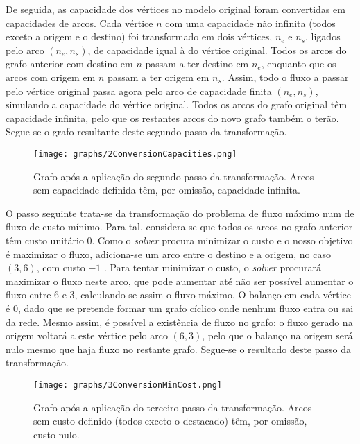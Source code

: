 \documentclass[12pt, a4paper, titlepage]{article}
\begin{document}
De seguida, as capacidade dos vértices no modelo original foram convertidas em capacidades de arcos.
Cada vértice $n$ com uma capacidade não infinita (todos exceto a origem e o destino) foi
transformado em dois vértices, $n_e$ e $n_s$, ligados pelo arco $(n_e, n_s)$, de capacidade igual à
do vértice original. Todos os arcos do grafo anterior com destino em $n$ passam a ter destino em
$n_e$, enquanto que os arcos com origem em $n$ passam a ter origem em $n_s$. Assim, todo o fluxo a
passar pelo vértice original passa agora pelo arco de capacidade finita $(n_e, n_s)$, simulando a
capacidade do vértice original. Todos os arcos do grafo original têm capacidade infinita, pelo que
os restantes arcos do novo grafo também o terão. Segue-se o grafo resultante deste segundo passo da
transformação.

\begin{figure}[H]
    \centering
    \texttt{[image: graphs/2ConversionCapacities.png]}
    \caption{Grafo após a aplicação do segundo passo da transformação. Arcos sem capacidade
        definida têm, por omissão, capacidade infinita.}
    \label{2conversion-graph}
\end{figure}

O passo seguinte trata-se da transformação do problema de fluxo máximo num de fluxo de custo mínimo.
Para tal, considera-se que todos os arcos no grafo anterior têm custo unitário 0. Como o
\emph{solver} procura minimizar o custo e o nosso objetivo é maximizar o fluxo, adiciona-se um arco
entre o destino e a origem, no caso $(3, 6)$, com custo $-1$ \cite{book}. Para tentar minimizar o
custo, o \emph{solver} procurará maximizar o fluxo neste arco, que pode aumentar até não ser
possível aumentar o fluxo entre 6 e 3, calculando-se assim o fluxo máximo. O balanço em cada vértice
é 0, dado que se pretende formar um grafo cíclico onde nenhum fluxo entra ou sai da rede. Mesmo
assim, é possível a existência de fluxo no grafo: o fluxo gerado na origem voltará a este vértice
pelo arco $(6, 3)$, pelo que o balanço na origem será nulo mesmo que haja fluxo no restante grafo.
Segue-se o resultado deste passo da transformação.

\begin{figure}[H]
    \centering
    \texttt{[image: graphs/3ConversionMinCost.png]}
    \caption{ \onehalfspacing
        Grafo após a aplicação do terceiro passo da transformação. Arcos sem custo definido (todos
        exceto o destacado) têm, por omissão, custo nulo.}
    \label{3conversion-graph}
\end{figure}
\end{document}
